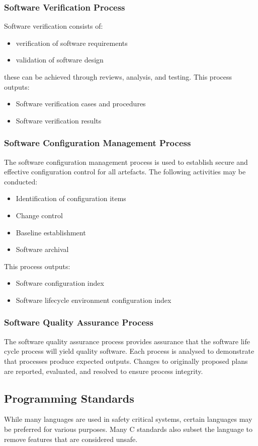 \documentclass{article}
\begin{document}
\subsubsection{Software Verification Process}
Software verification consists of:
\begin{itemize}
    \item verification of software requirements
    \item validation of software design
\end{itemize}
these can be achieved through reviews, analysis, and testing.
This process outputs:
\begin{itemize}
    \item Software verification cases and procedures
    \item Software verification results
\end{itemize}
\subsubsection{Software Configuration Management Process}
The software configuration management process is used to establish
secure and effective configuration control for all artefacts. The
following activities may be conducted:
\begin{itemize}
    \item Identification of configuration items
    \item Change control
    \item Baseline establishment
    \item Software archival
\end{itemize}
This process outputs:
\begin{itemize}
    \item Software configuration index
    \item Software lifecycle environment configuration index
\end{itemize}
\subsubsection{Software Quality Assurance Process}
The software quality assurance process provides assurance that the
software life cycle process will yield quality software. Each process
is analysed to demonstrate that processes produce expected outputs.
Changes to originally proposed plans are reported, evaluated, and
resolved to ensure process integrity.
\subsection{Programming Standards}
While many languages are used in safety critical systems, certain
languages may be preferred for various purposes. Many C standards also
subset the language to remove features that are considered unsafe.
\end{document}

